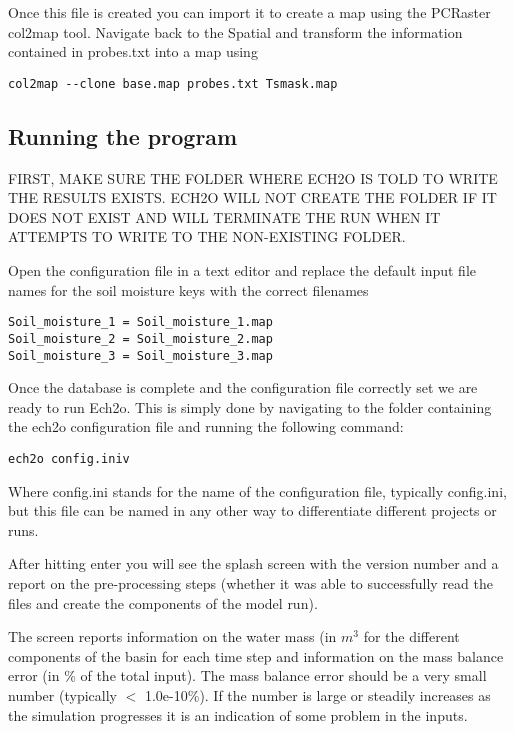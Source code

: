 Once this file is created you can import it to create a map using the PCRaster \textsf{col2map} tool. Navigate back to the \textsf{Spatial} and transform the information contained in \textsf{probes.txt} into a map using   

\begin{verbatim}
col2map --clone base.map probes.txt Tsmask.map
\end{verbatim} 
 

 
 
\subsection{Running the program}

FIRST, MAKE SURE THE FOLDER WHERE ECH2O IS TOLD TO WRITE THE RESULTS EXISTS. ECH2O WILL NOT CREATE THE FOLDER IF IT DOES NOT EXIST AND WILL TERMINATE THE RUN WHEN IT ATTEMPTS TO WRITE TO THE NON-EXISTING FOLDER.

Open the configuration file in a text editor and replace the default input file names for the soil moisture keys with the correct filenames

\begin{verbatim}
Soil_moisture_1 = Soil_moisture_1.map 
Soil_moisture_2 = Soil_moisture_2.map 
Soil_moisture_3 = Soil_moisture_3.map 
\end{verbatim} 
 
Once the database is complete and the configuration file correctly set we are ready to run Ech2o. This is simply done by navigating to the folder containing the ech2o configuration file and running the following command: 

\begin{verbatim}
ech2o config.iniv
\end{verbatim} 

Where \textsf{config.ini} stands for the name of the configuration file, typically \textsf{config.ini}, but this file can be named in any other way to differentiate different projects or runs. 

After hitting enter you will see the splash screen with the version number and a report on the pre-processing steps (whether it was able to successfully read the files and create the components of the model run). 

The screen reports information on the water mass (in $ m^{3} $ for the different components of the basin for each time step and information on the mass balance error (in \% of the total input). The mass balance error should be a very small number (typically $<$ 1.0e-10\%). If the number is large or steadily increases as the simulation progresses it is an indication of some problem in the inputs. 

